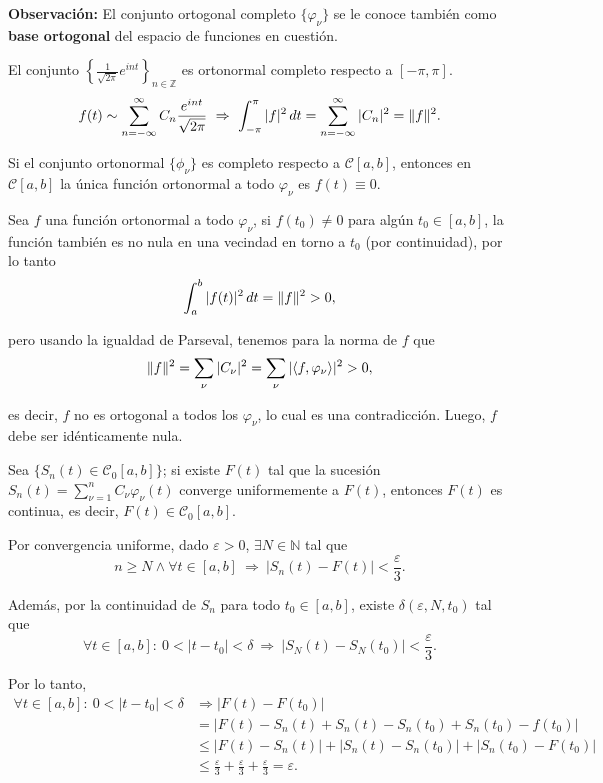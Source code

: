 \textbf{Observación:} El conjunto ortogonal completo $\{\varphi_{\nu}\}$ se le conoce también como \textbf{base ortogonal} del espacio de funciones en cuestión.

\begin{ejemplo}
El conjunto $\left\{ \frac{1}{\sqrt{2 \pi}} e^{i n t} \right\}_{n \in \mathbb{Z}}$ es ortonormal completo respecto a $[-\pi,\pi]$.
$$f(t) \sim \sum_{n = - \infty}^{\infty} C_n \frac{e^{int}}{\sqrt{2\pi}} ~\Rightarrow~ \int_{-\pi}^{\pi} |f|^2 \,dt = \sum_{n=- \infty}^{\infty} |C_n|^2 = \lVert f\rVert^2 .$$
\end{ejemplo}


\begin{teorema}{}{} 
Si el conjunto ortonormal $\{\phi_{\nu}\}$ es completo respecto a $\mathscr{C}[a,b]$, entonces en $\mathscr{C}[a,b]$ la única función ortonormal a todo $\varphi_{\nu}$ es $f(t) \equiv 0$.
\end{teorema}

\begin{demo}
Sea $f$ una función ortonormal a todo $\varphi_{\nu}$, si $f(t_0) \neq 0$ para algún $t_0 \in [a,b]$, la función también es no nula en una vecindad en torno a $t_0$ (por continuidad), por lo tanto 
$$\int_a^b |f(t)|^2 \,dt = \lVert f\rVert^2  > 0,$$

pero usando la igualdad de Parseval, tenemos para la norma de $f$ que
$$\lVert f\rVert^2  = \sum_{\nu} |C_{\nu}|^2 = \sum_{\nu} |\langle f ,\varphi_{\nu} \rangle|^2 > 0,$$

es decir, $f$ no es ortogonal a todos los $\varphi_{\nu}$, lo cual es una contradicción. Luego, $f$ debe ser idénticamente nula.
\end{demo}

\begin{teorema}
Sea $\{S_n(t) \in \mathscr{C}_0[a,b]\}$; si existe $F(t)$ tal que la sucesión $S_n(t) = \sum\limits_{\nu = 1}^n C_{\nu} \varphi_{\nu}(t)$ converge uniformemente a $F(t)$, entonces $F(t)$ es continua, es decir, $F(t) \in \mathscr{C}_0[a,b]$.
\end{teorema}

\begin{demo}
Por convergencia uniforme, dado $\varepsilon > 0$, $\exists N \in \mathbb{N}$ tal que
$$n \geq N \wedge \forall t \in [a,b] ~\Rightarrow~ |S_n(t) - F(t)| < \frac{\varepsilon}{3}.$$

Además, por la continuidad de $S_n$ para todo $t_0 \in [a,b]$, existe $\delta(\varepsilon, N, t_0)$ tal que
$$\forall t \in [a,b]: ~ 0 < |t-t_0| < \delta ~\Rightarrow~ |S_N(t) - S_N(t_0)| < \frac{\varepsilon}{3}.$$

Por lo tanto, 
\begin{align*}
 \forall t \in [a,b]: ~ 0 < |t-t_0| < \delta &\Rightarrow |F(t) - F(t_0)|  \\
 &= |F(t) - S_n(t) + S_n(t) - S_n(t_0) + S_n(t_0) - f(t_0)| \\
 &\leq |F(t) - S_n(t)| + |S_n(t) - S_n(t_0)| + |S_n(t_0) - F(t_0)| \\
 &\leq \frac{\varepsilon}{3} + \frac{\varepsilon}{3} + \frac{\varepsilon}{3} = \varepsilon .
\end{align*}
\end{demo}

